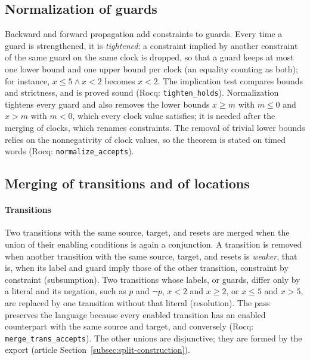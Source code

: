 \subsection{Normalization of guards}
\label{sec:normalize}
Backward and forward propagation add constraints to guards.  Every time a
guard is strengthened, it is \emph{tightened}: a constraint implied by another
constraint of the same guard on the same clock is dropped, so that a guard
keeps at most one lower bound and one upper bound per clock (an equality
counting as both); for instance, $x\le5\land x<2$ becomes $x<2$.  The
implication test compares bounds and strictness, and is proved sound (Rocq:
\texttt{tighten\_\allowbreak{}holds}).  Normalization tightens every guard and also
removes the lower bounds $x\ge m$ with $m\le0$ and $x>m$ with $m<0$, which every
clock value satisfies; it is needed after the merging of clocks, which renames
constraints.  The removal of trivial lower bounds relies on the nonnegativity
of clock values, so the theorem is stated on timed words (Rocq:
\texttt{normalize\_\allowbreak{}accepts}).

\subsection{Merging of transitions and of locations}
\label{sec:merge-ts}\label{sec:main-merge-ts}
\paragraph{Transitions}
Two transitions with the same source, target, and resets are merged when the
union of their enabling conditions is again a conjunction.  A transition is
removed when another transition with the same source, target, and resets is
\emph{weaker}, that is, when its label and guard imply those of the other
transition, constraint by constraint (subsumption).  Two transitions
whose labels, or guards, differ only by a literal and its negation, such as
$p$ and $\neg p$, $x<2$ and $x\ge2$, or $x\le5$ and $x>5$, are replaced by one
transition without that literal (resolution).  The pass preserves the language
because every enabled transition has an enabled counterpart with the same
source and target, and conversely (Rocq: \texttt{merge\_\allowbreak{}trans\_\allowbreak{}accepts}).
The other unions are disjunctive; they are formed by the export
(article Section~\ref{subsec:split-construction}).

